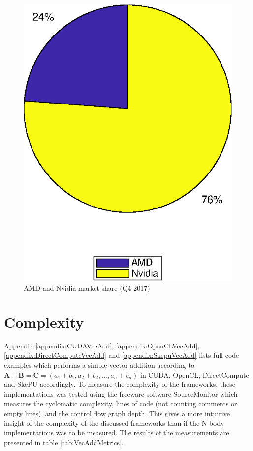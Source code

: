 \begin{figure}[H]
    \centering
    \includegraphics[width=.5\textwidth]{Results/Figs/GPUMarketShare.eps}
    \caption{AMD and Nvidia market share (Q4 2017)}
    \label{fig:GPUMarketShare}
\end{figure}




\section{Complexity} \label{sec:ResultComplexity}

Appendix \ref{appendix:CUDAVecAdd}, \ref{appendix:OpenCLVecAdd}, \ref{appendix:DirectComputeVecAdd} and \ref{appendix:SkepuVecAdd} lists full code examples which performs a simple vector addition according to 
$\boldsymbol A + \boldsymbol B = \boldsymbol C = (a_1 + b_1, a_2 + b_2, ... , a_n +b_n)$ in CUDA, OpenCL, DirectCompute and SkePU accordingly. To measure the complexity of the frameworks, these implementations was tested using the freeware software SourceMonitor \cite{SourceMonitor} which measures the cyclomatic complexity, lines of code (not counting comments or empty lines), and the control flow graph depth. This gives a more intuitive insight of the complexity of the discussed frameworks than if the N-body implementations was to be measured. The results of the measurements are presented in table \ref{tab:VecAddMetrics}.


